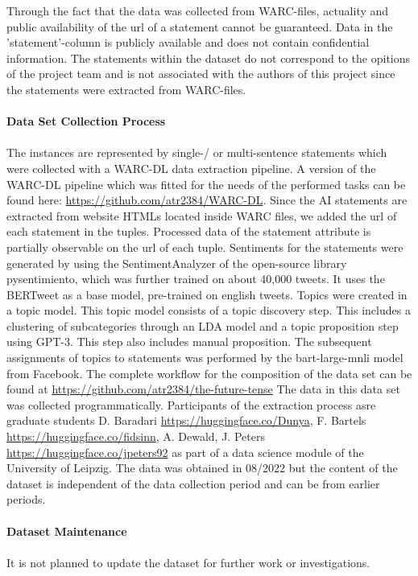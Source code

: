 Through the fact that the data was collected from WARC-files, actuality and public availability of the url of a statement cannot be guaranteed.
Data in the 'statement'-column is publicly available and does not contain confidential information.
The statements within the dataset do not correspond to the opitions of the project team and is not associated with the authors of this project since the statements were extracted from WARC-files.
\\
\\
\textbf{Data Set Collection Process}
\\
\\
The instances are represented by single-/ or multi-sentence statements which were collected with a WARC-DL data extraction pipeline.
A version of the WARC-DL pipeline which was fitted for the needs of the performed tasks can be found here: \url{https://github.com/atr2384/WARC-DL}.
Since the AI statements are extracted from website HTMLs located inside WARC files, we added the url of each statement in the tuples.
Processed data of the statement attribute is partially observable on the url of each tuple.
Sentiments for the statements were generated by using the SentimentAnalyzer of the open-source library pysentimiento, which was further trained on about 40,000 tweets.
It uses the BERTweet as a base model, pre-trained on english tweets.
Topics were created in a topic model. This topic model consists of a topic discovery step.
This includes a clustering of subcategories through an LDA model and a topic proposition step using GPT-3.
This step also includes manual proposition.
The subsequent assignments of topics to statements was performed by the bart-large-mnli model from Facebook.
The complete workflow for the composition of the data set can be found at \url{https://github.com/atr2384/the-future-tense}
The data in this data set was collected programmatically.
Participants of the extraction process asre graduate students D. Baradari \url{https://huggingface.co/Dunya}, F. Bartels \url{https://huggingface.co/fidsinn}, A. Dewald, J. Peters \url{https://huggingface.co/jpeters92} as part of a data science module of the University of Leipzig.
The data was obtained in 08/2022 but the content of the dataset is independent of the data collection period and can be from earlier periods.
\\
\\
\textbf{Dataset Maintenance}
\\
\\
It is not planned to update the dataset for further work or investigations.
